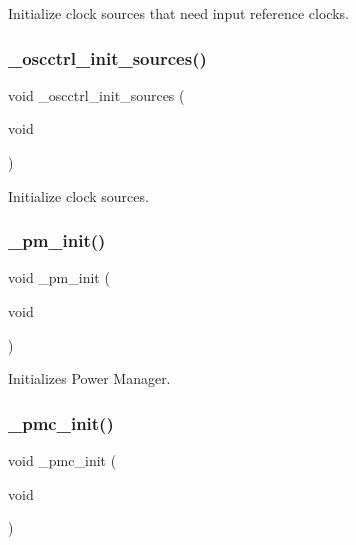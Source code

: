 Initialize clock sources that need input reference clocks. 

\mbox{\label{group___h_p_l_gaee0105b1dbc07a2ca23586aa95f49cc7}} 
\subsubsection{\texorpdfstring{\+\_\+oscctrl\+\_\+init\+\_\+sources()}{\_oscctrl\_init\_sources()}}
{\footnotesize\ttfamily void \+\_\+oscctrl\+\_\+init\+\_\+sources (\begin{DoxyParamCaption}\item[{void}]{ }\end{DoxyParamCaption})}



Initialize clock sources. 

\mbox{\label{group___h_p_l_ga0e9b9fbf16506f0f6ad8e8b1aa87dc73}} 
\subsubsection{\texorpdfstring{\+\_\+pm\+\_\+init()}{\_pm\_init()}}
{\footnotesize\ttfamily void \+\_\+pm\+\_\+init (\begin{DoxyParamCaption}\item[{void}]{ }\end{DoxyParamCaption})}



Initializes Power Manager. 

\mbox{\label{group___h_p_l_ga580e99e942064901ed0f02f5d8789c7a}} 
\subsubsection{\texorpdfstring{\+\_\+pmc\+\_\+init()}{\_pmc\_init()}}
{\footnotesize\ttfamily void \+\_\+pmc\+\_\+init (\begin{DoxyParamCaption}\item[{void}]{ }\end{DoxyParamCaption})}



